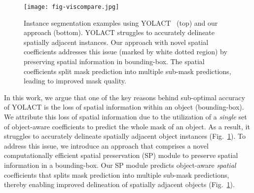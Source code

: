 \documentclass[runningheads]{llncs}
\begin{document}
\begin{figure}[t!]
\centering
\texttt{[image: fig-viscompare.jpg]} 
\caption{Instance segmentation examples using YOLACT~\cite{Bolya_YOLACT_ICCV_2019} (top) and our approach (bottom). YOLACT struggles to accurately delineate spatially adjacent instances. Our approach with novel spatial coefficients addresses this issue (marked by white dotted region) by preserving spatial information in bounding-box. The spatial coefficients split mask prediction into  multiple  sub-mask  predictions, leading to improved mask quality.}
\label{fig:vis_compare} 
\end{figure}

In this work, we argue that one of the key reasons behind sub-optimal accuracy of YOLACT is the loss of spatial information within an object (bounding-box). We attribute this loss of spatial information due to the utilization of a \textit{single} set of object-aware coefficients to predict the whole mask of an object. As a result, it struggles to accurately delineate spatially adjacent object instances (Fig.~\ref{fig:vis_compare}). To address this issue, we introduce an approach that comprises a novel computationally efficient spatial preservation (SP) module to preserve spatial information in a bounding-box. Our SP module predicts object-aware \textit{spatial} coefficients that splits mask prediction into  multiple sub-mask predictions, thereby enabling improved delineation of spatially adjacent objects (Fig.~\ref{fig:vis_compare}).
\end{document}
